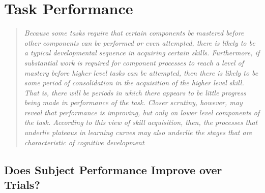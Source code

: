 \documentclass[../main.tex]{subfiles}
\begin{document}
\chapter{Task Performance}\label{chap:performance}

\begin{quote}
    \emph{Because some tasks require that certain components be mastered before other components can be performed or even attempted, there is likely to be a typical developmental sequence in acquiring certain skills. Furthermore, if substantial work is required for component processes to reach a level of mastery before higher level tasks can be attempted, then there is likely to be some period of consolidation in the acquisition of the higher level skill. That is, there will be periods in which there appears to be little progress being made in performance of the task. Closer scrutiny, however, may reveal that performance is improving, but only on lower level components of the task. According to this view of skill acquisition, then, the processes that underlie plateaus in learning curves may also underlie the stages that are characteristic of cognitive development}\\
\end{quote}




\cleardoublepage%



\section{Does Subject Performance Improve over Trials?}
\end{document}
